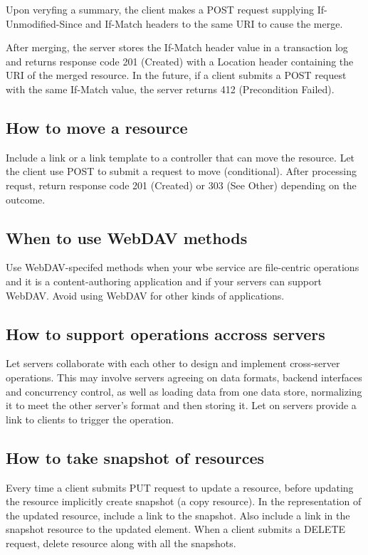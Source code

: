 \documentclass[11pt,a4paper]{article}
\begin{document}
Upon veryfing a summary, the client makes a POST request supplying If-Unmodified-Since and If-Match headers to the same URI to cause the merge.

After merging, the server stores the If-Match header value in a transaction log and returns response code 201 (Created) with a Location header containing the URI of the merged resource. In the future, if a client submits a POST request with the same If-Match value, the server returns 412 (Precondition Failed).

\subsection{How to move a resource}
Include a link or a link template to a controller that can move the resource. Let the client use POST to submit a request to move (conditional). After processing requst, return response code 201 (Created) or 303 (See Other) depending on the outcome.

\subsection{When to use WebDAV methods}
Use WebDAV-specifed methods when your wbe service are file-centric operations and it is a content-authoring application and if your servers can support WebDAV. Avoid using WebDAV for other kinds of applications.

\subsection{How to support operations accross servers}
Let servers collaborate with each other to design and implement cross-server operations. This may involve servers agreeing on data formats, backend interfaces and concurrency control, as well as loading data from one data store, normalizing it to meet the other server's format and then storing it. Let on servers provide a link to clients to trigger the operation.

\subsection{How to take snapshot of resources}
Every time a client submits PUT request to update a resource, before updating the resource implicitly create snapshot (a copy resource). In the representation of the updated resource, include a link to the snapshot. Also include a link in the snapshot resource to the updated element. When a client submits a DELETE request, delete resource along with all the snapshots.
\end{document}
